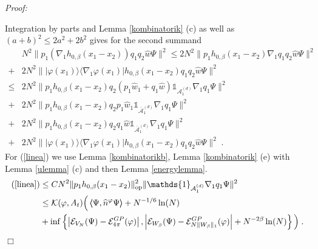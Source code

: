 \documentclass[11pt, english, american]{article}
\newcommand{\llaa}{\left\langle\hspace{-0.14cm}\left\langle}
\newcommand{\rraa}{\right\rangle\hspace{-0.14cm}\right\rangle}
\newenvironment{proof}{\emph{Proof:}}{\begin{flushright} $ \Box $ \end{flushright}}
\renewcommand{\phi}{\varphi}
\begin{document}
\begin{proof}
\begin{enumerate}
Integration by parts and Lemma \ref{kombinatorik} (c) as well as $(a+b)^2\leq 2a^2+2b^2$ gives for the second summand 
\begin{align}\nonumber
&N^2\|p_1(\nabla_1h_{0,\beta}(x_1-x_2))q_1q_2\widehat{w}\Psi\|^2\leq 2N^2\|p_1h_{0,\beta}(x_1-x_2)\nabla_1q_1q_2\widehat{w}\Psi\|^2
%
\\
\nonumber+&2N^2\||\phi(x_1)\rangle\langle\nabla_1\phi(x_1)|h_{0,\beta}(x_1-x_2)q_1q_2\widehat{w}\Psi\|^2
%
\\\label{linea}\leq&2N^2\|p_1h_{0,\beta}(x_1-x_2)q_2(p_1\widehat{w}_1+q_1\widehat{w})\mathds{1}_{\mathcal{A}^{(d)}_{1}}\nabla_1q_1\Psi\|^2
%
\\\label{lineb}+&2N^2\|p_1h_{0,\beta}(x_1-x_2)q_2p_1\widehat{w}_1\mathds{1}_{\overline{\mathcal{A}}^{(d)}_{1}}\nabla_1q_1\Psi\|^2
%
\\\label{linec}+&2N^2\|p_1h_{0,\beta}(x_1-x_2)q_2q_1\widehat{w}\mathds{1}_{\overline{\mathcal{A}}^{(d)}_{1}}\nabla_1q_1\Psi\|^2
%
\\\label{lined}+&2N^2\||\phi(x_1)\rangle\langle\nabla_1\phi(x_1)|h_{0,\beta}(x_1-x_2)q_1q_2\widehat{w}\Psi\|^2
\;.
\end{align}
For (\ref{linea}) we use Lemma \ref{kombinatorikb}, Lemma \ref{kombinatorik} (e) with Lemma \ref{ulemma} (c) and then Lemma \ref{energylemma}.
\begin{align*}
 (\ref{linea})&\leq CN ^2\|p_1h_{0,\beta}(x_1-x_2)\|_{\text{op}}^2\|\mathds{1}_{\mathcal{A}^{(d)}_{1}}\nabla_1q_1\Psi\|^2
\\& \leq 
\mathcal{K}(\phi,A_t)
  \Big( \llaa\Psi,\widehat{n}^{\phi}\Psi\rraa+N^{-1/6} \ln(N)
\\
&+
\inf \left\lbrace 
\left|\mathcal{E}_{V_N}(\Psi)-\mathcal{E}_{4 \pi}^{GP}(\phi)\right|,
\left|\mathcal{E}_{W_\beta}(\Psi)-\mathcal{E}_{N \|W_\beta\|_1}^{GP}(\phi)\right|+ N^{-2 \beta} \ln(N)
\right\rbrace
\Big)
\;.
\end{align*}


\end{enumerate}
\end{proof}
\end{document}
